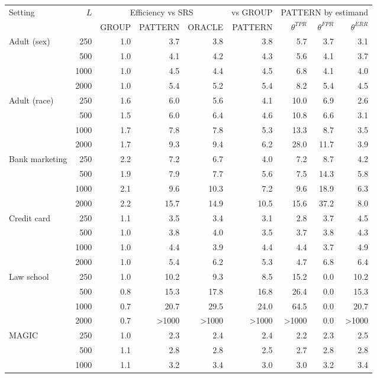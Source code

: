 \begin{tabular}{lrrrrrrrr}\toprule
Setting & $L$ & \multicolumn{3}{c}{Efficiency vs SRS} & vs GROUP & \multicolumn{3}{c}{PATTERN by estimand} \\
 & & GROUP & PATTERN & ORACLE & PATTERN & $\theta^{TPR}$ & $\theta^{FPR}$ & $\theta^{ERR}$ \\\midrule
Adult (sex) & 250 & 1.0 & 3.7 & 3.8 & 3.8 & 5.7 & 3.7 & 3.1 \\
 & 500 & 1.0 & 4.1 & 4.2 & 4.3 & 5.6 & 4.1 & 3.7 \\
 & 1000 & 1.0 & 4.5 & 4.4 & 4.5 & 6.8 & 4.1 & 4.0 \\
 & 2000 & 1.0 & 5.4 & 5.2 & 5.4 & 8.2 & 5.4 & 4.5 \\
\addlinespace
Adult (race) & 250 & 1.6 & 6.0 & 5.6 & 4.1 & 10.0 & 6.9 & 2.6 \\
 & 500 & 1.5 & 6.0 & 6.4 & 4.6 & 10.8 & 6.6 & 3.1 \\
 & 1000 & 1.7 & 7.8 & 7.8 & 5.3 & 13.3 & 8.7 & 3.5 \\
 & 2000 & 1.7 & 9.3 & 9.4 & 6.2 & 28.0 & 11.7 & 3.9 \\
\addlinespace
Bank marketing & 250 & 2.2 & 7.2 & 6.7 & 4.0 & 7.2 & 8.7 & 4.2 \\
 & 500 & 1.9 & 7.9 & 7.7 & 5.6 & 7.5 & 14.3 & 5.8 \\
 & 1000 & 2.1 & 9.6 & 10.3 & 7.2 & 9.6 & 18.9 & 6.3 \\
 & 2000 & 2.2 & 15.7 & 14.9 & 10.5 & 15.6 & 37.2 & 8.0 \\
\addlinespace
Credit card & 250 & 1.1 & 3.5 & 3.4 & 3.1 & 2.8 & 3.7 & 4.5 \\
 & 500 & 1.0 & 3.8 & 4.0 & 3.5 & 3.7 & 3.8 & 4.3 \\
 & 1000 & 1.0 & 4.4 & 3.9 & 4.4 & 4.4 & 3.7 & 4.9 \\
 & 2000 & 1.0 & 5.4 & 6.2 & 5.3 & 4.7 & 6.8 & 6.4 \\
\addlinespace
Law school & 250 & 1.0 & 10.2 & 9.3 & 8.5 & 15.2 & 0.0 & 10.2 \\
 & 500 & 0.8 & 15.3 & 17.8 & 16.8 & 26.4 & 0.0 & 15.3 \\
 & 1000 & 0.7 & 20.7 & 29.5 & 24.0 & 64.5 & 0.0 & 20.7 \\
 & 2000 & 0.7 & >1000 & >1000 & >1000 & >1000 & 0.0 & >1000 \\
\addlinespace
MAGIC & 250 & 1.0 & 2.3 & 2.4 & 2.4 & 2.2 & 2.3 & 2.5 \\
 & 500 & 1.1 & 2.8 & 2.8 & 2.5 & 2.7 & 2.8 & 2.8 \\
 & 1000 & 1.1 & 3.2 & 3.4 & 3.0 & 3.0 & 3.2 & 3.4 \\

\end{tabular}
